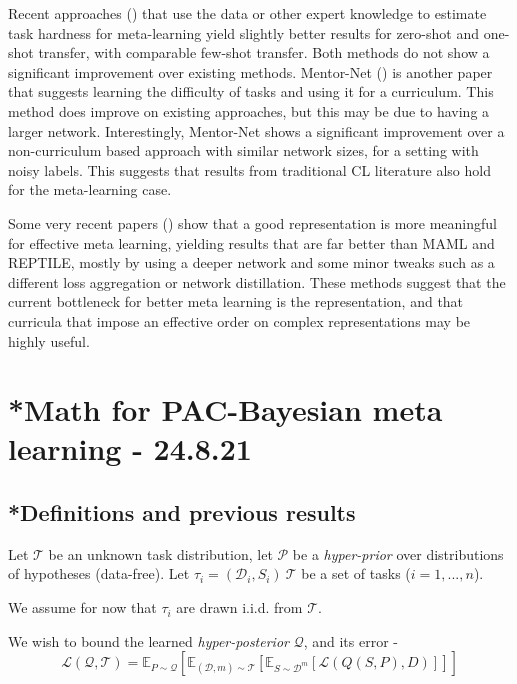 \documentclass[letterpaper]{article}
\theoremstyle{definition}
\begin{document}
Recent approaches (\cite{Saglietti2021, Khodak2019}) that use the data or other expert knowledge to estimate task hardness for meta-learning yield slightly better results for zero-shot and one-shot transfer, with comparable few-shot transfer. 
Both methods do not show a significant improvement over existing methods.
Mentor-Net (\cite{Jiang2017}) is another paper that suggests learning the difficulty of tasks and using it for a curriculum. This method does improve on existing approaches, but this may be due to having a larger network.
Interestingly, Mentor-Net shows a significant improvement over a non-curriculum based approach with similar network sizes, for a setting with noisy labels. This suggests that results from traditional CL literature also hold for the meta-learning case.

Some very recent papers (\cite{Bateni2020, Tian2020}) show that a good representation is more meaningful for effective meta learning, yielding results that are far better than MAML and REPTILE, mostly by using a deeper network and some minor tweaks such as a different loss aggregation or network distillation. 
These methods suggest that the current bottleneck for better meta learning is the representation, and that curricula that impose an effective order on complex representations may be highly useful.

\section{*Math for PAC-Bayesian meta learning - 24.8.21} \label{sec:bayes}

\subsection{*Definitions and previous results} 

Let $\mathcal{T}$ be an unknown task distribution, let $\mathcal{P}$ be a \emph{hyper-prior} over distributions of hypotheses (data-free). Let $\tau_i=(\mathcal{D}_i, S_i)~\mathcal{T}$ be a set of tasks ($i=1,...,n$).

We assume for now that $\tau_i$ are drawn i.i.d. from $\mathcal{T}$.

We wish to bound the learned \emph{hyper-posterior} $\mathcal{Q}$, and its error - 
$$\mathcal{L}(\mathcal{Q}, \mathcal{T})=\mathbb{E}_{P\sim \mathcal{Q}}[\mathbb{E}_{(\mathcal{D}, m)\sim \mathcal{T}}[\mathbb{E}_{S\sim \mathcal{D}^m}[\mathcal{L}(Q(S,P), D)]]]$$
\end{document}
